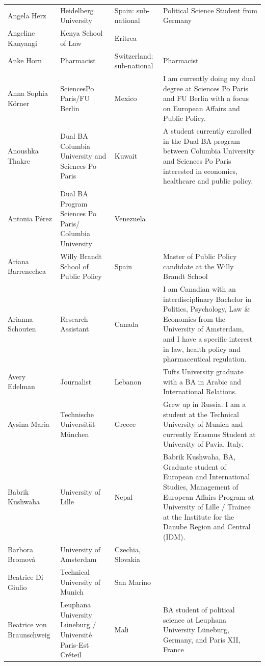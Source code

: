 \documentclass[
]{article}
\begin{document}
\begin{longtable}[t]{l>{\raggedright\arraybackslash}p{2cm}>{\raggedright\arraybackslash}p{2cm}>{\raggedright\arraybackslash}p{3cm}}
Angela Herz & Heidelberg University & Spain: sub-national & Political Science Student from Germany\\
\rowcolor{gray!6}  Angeline Kanyangi & Kenya School of Law & Eritrea & \\
\addlinespace
Anke Horn & Pharmacist & Switzerland: sub-national & Pharmacist\\
\rowcolor{gray!6}  Anna Sophia Körner & SciencesPo Paris/FU Berlin & Mexico & I am currently doing my dual degree at Sciences Po Paris and FU Berlin with a focus on European Affairs and Public Policy.\\
Anoushka Thakre & Dual BA Columbia University and Sciences Po Paris & Kuwait & A student currently enrolled in the Dual BA program between Columbia University and Sciences Po Paris interested in economics, healthcare and public policy.\\
\rowcolor{gray!6}  Antonia Pérez & Dual BA Program Sciences Po Paris/ Columbia University & Venezuela & \\
Ariana Barrenechea & Willy Brandt School of Public Policy & Spain & Master of Public Policy candidate at the Willy Brandt School\\
\addlinespace
\rowcolor{gray!6}  Arianna Schouten & Research Assistant & Canada & I am Canadian with an interdisciplinary Bachelor in Politics, Psychology, Law \& Economics from the University of Amsterdam, and I have a specific interest in law, health policy and pharmaceutical regulation.\\
Avery Edelman & Journalist & Lebanon & Tufts University graduate with a BA in Arabic and International Relations.\\
\rowcolor{gray!6}  Aysina Maria & Technische Universität München & Greece & Grew up in Russia. I am a student at the Technical University of Munich and currently Erasmus Student at University of Pavia, Italy.\\
Babrik Kushwaha & University of Lille & Nepal & Babrik Kushwaha, BA, Graduate student of European and International Studies, Management of European Affairs Program at University of Lille / Trainee at the Institute for the Danube Region and Central (IDM).\\
\rowcolor{gray!6}  Barbora Bromová & University of Amsterdam & Czechia, Slovakia & \\
\addlinespace
Beatrice Di Giulio & Technical University of Munich & San Marino & \\
\rowcolor{gray!6}  Beatrice von Braunschweig & Leuphana University Lüneburg / Université Paris-Est Créteil & Mali & BA student of political science at Leuphana University Lüneburg, Germany, and Paris XII, France\\

\end{longtable}
\end{document}
